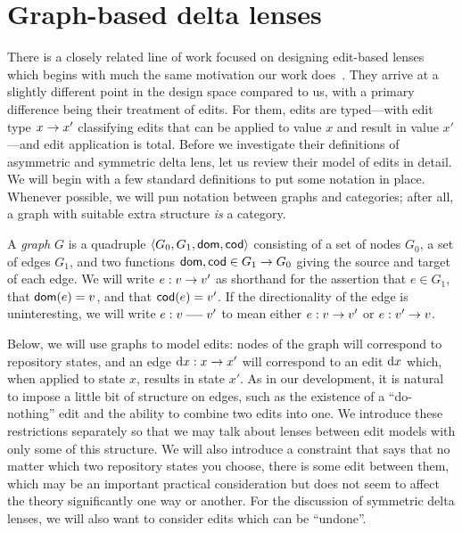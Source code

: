 \section{Graph-based delta lenses}
\label{sec:delta}

There is a closely related line of work focused on designing edit-based
lenses which begins with much the same motivation our work
does~\cite{diskin2011asymmetric,Diskin-Delta11,hermann2011correctness,Pacheco2012}.
They arrive at a slightly different point in the design space compared to
us, with a primary difference being their treatment of edits. For them,
edits are typed---with edit type $x \to x'$ classifying edits that can be
applied to value $x$ and result in value $x'$---and edit application is
total. Before we investigate their definitions of asymmetric and symmetric
delta lens, let us review their model of edits in detail. We will begin with
a few standard definitions to put some notation in place. Whenever possible,
we will pun notation between graphs and categories; after all, a graph with
suitable extra structure \emph{is} a category.

\begin{definition}
    A \emph{graph} $G$ is a quadruple $\left<G_0,G_1,\mathsf{dom},\mathsf{cod}\right>$
    consisting of a set of nodes $G_0$, a set of edges $G_1$, and two
    functions $\mathsf{dom},\mathsf{cod} \in G_1 \to G_0$ giving the source and target
    of each edge. We will write $e:v \to v'$ as shorthand for the
    assertion that $e \in G_1$, that $\mathsf{dom}(e)=v$, and that $\mathsf{cod}(e)=v'$.
    If the directionality of the edge is uninteresting, we will write $e:v
    \uedge v'$ to mean either $e: v \to v'$ or $e: v' \to v$.
\end{definition}

Below, we will use graphs to model edits: nodes of the graph will correspond
to repository states, and an edge $\textrm{d} x : x \to x'$ will correspond to an
edit $\textrm{d} x$ which, when applied to state $x$, results in state $x'$. As in
our development, it is natural to impose a little bit of structure on edges,
such as the existence of a ``do-nothing'' edit and the ability to combine
two edits into one. We introduce these restrictions separately so that we
may talk about lenses between edit models with only some of this structure.
We will also introduce a constraint that says that no matter which two
repository states you choose, there is some edit between them, which may be
an important practical consideration but does not seem to affect the theory
significantly one way or another. For the discussion of symmetric delta
lenses, we will also want to consider edits which can be ``undone''.

